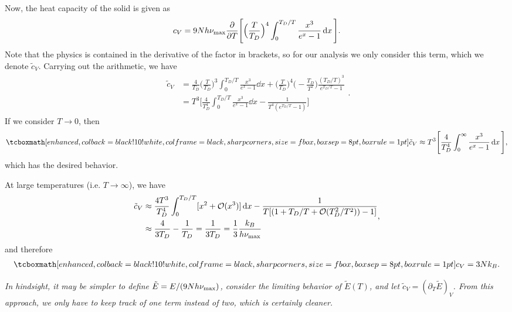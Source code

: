 {Now, the heat capacity of the solid is given as
\begin{eqnarray}
    c_{V} = 9 N h \nu_{\rm max} \pdv{T} \Bigg[ \Big( \frac{T}{T_{D}} \Big)^{4} \int_{0}^{T_{D}/T}\frac{x^3}{e^{x} - 1} \dd{x} \Bigg]
.\end{eqnarray}
Note that the physics is contained in the derivative of the factor in brackets, so for our analysis we only consider this term, which we denote $\tilde{c}_{V}$.
Carrying out the arithmetic, we have 
\begin{eqnarray}
   \begin{aligned}
       \tilde{c}_{V} &= \frac{4}{T_{D}} \Big( \frac{T}{T_{D}} \Big)^{3} \int_{0}^{T_{D}/T} \frac{x^3}{e^{x} - 1} \dd{x} + \Big( \frac{T}{T_{D}} \Big)^{4} \Big( -\frac{T_{D}}{T^2} \Big) \frac{(T_{D}/T)^3}{e^{T_{D}/T} - 1} \\
                     &= T^3 \Bigg[ \frac{4}{T_{D}^{4}} \int_{0}^{T_{D}/T} \frac{x^{3}}{e^{x} - 1} \dd{x} - \frac{1}{T^{4}(e^{T_{D}/T} - 1)} \Bigg]
   \end{aligned} 
.\end{eqnarray}
If we consider $T \rightarrow 0$, then
\begin{eqnarray}
    \eqbox{ \tilde{c}_{V} \approx T^3 \Bigg[ \frac{4}{T_{D}^{4}} \int_{0}^{\infty} \frac{x^3}{e^{x} - 1} \dd{x} \Bigg] }
,\end{eqnarray}
which has the desired behavior.

At large temperatures (i.e. $T \rightarrow \infty$), we have
\begin{eqnarray}
    \begin{aligned}
        \tilde{c}_{V} &\approx \frac{4T^3}{T_{D}^{4}} \int_{0}^{T_{D}/T} [x^2 + {\cal O}(x^3)] \dd{x} - \frac{1}{T[ (1 + T_{D}/T + {\cal O}(T_{D}^2/T^2)) - 1 ]} \\
                      &\approx \frac{4}{3 T_{D}} - \frac{1}{T_{D}} = \frac{1}{3 T_{D}} = \frac{1}{3} \frac{k_{B}}{h \nu_{\rm max}}
    \end{aligned}
,\end{eqnarray}
and therefore
\begin{eqnarray}
    \eqbox{ c_{V} = 3 N k_{B} }
.\end{eqnarray}

\textit{ In hindsight, it may be simpler to define $\tilde{E} = E/(9 N h \nu_{\rm max})$, consider the limiting behavior of $\tilde{E}(T)$, and let $\tilde{c}_{V} = (\partial_{T} \tilde{E})_{V}$.
From this approach, we only have to keep track of one term instead of two, which is certainly cleaner. }


}







